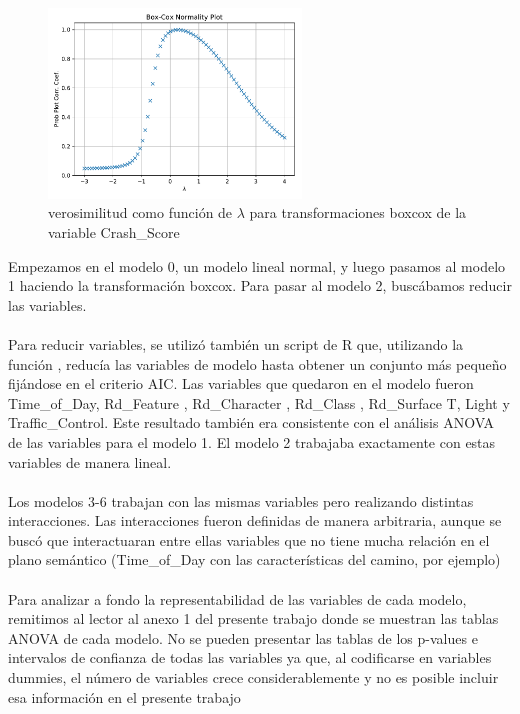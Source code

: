 \documentclass[11pt]{article}
\begin{document}
\begin{figure}[H]
    \centering
    \includegraphics[width = 0.6\textwidth]{3-boxcox.pdf}
    \caption{verosimilitud como función de $\lambda$ para transformaciones boxcox de la variable Crash\_Score}
    \label{fig:3-boxcox}
\end{figure}
Empezamos en el modelo 0, un modelo lineal normal, y luego pasamos al modelo 1 haciendo la transformación boxcox. Para pasar al modelo 2, buscábamos reducir las variables.
\\
\\Para reducir variables, se utilizó también un script de R que, utilizando la función , reducía las variables de modelo hasta obtener un conjunto más pequeño fijándose en el criterio AIC. Las variables que quedaron en el modelo fueron Time\_of\_Day, Rd\_Feature  , Rd\_Character  , Rd\_Class  , Rd\_Surface  T, Light  y Traffic\_Control. Este resultado también era consistente con el análisis ANOVA de las variables para el modelo 1. El modelo 2 trabajaba exactamente con estas variables de manera lineal.
\\
\\Los modelos 3-6 trabajan con las mismas variables pero realizando distintas interacciones. Las interacciones fueron definidas de manera arbitraria, aunque se buscó que interactuaran entre ellas variables que no tiene mucha relación en el plano semántico (Time\_of\_Day con las características del camino, por ejemplo)
\\
\\Para analizar a fondo la representabilidad de las variables de cada modelo, remitimos al lector al anexo 1 del presente trabajo donde se muestran las tablas ANOVA de cada modelo. No se pueden presentar las tablas de los p-values e intervalos de confianza de todas las variables ya que, al codificarse en variables dummies, el número de variables crece considerablemente y no es posible incluir esa información en el presente trabajo
\end{document}
